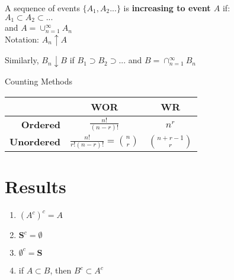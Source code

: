 \documentclass[12pt, oneside, letterpaper]{notes}
\begin{document}
\begin{mydef}
	A sequence of events $\{A_1, A_2 ...\}$ is \textbf{increasing to event $A$} if: \\
	\indent $A_1 \subset A_2 \subset ...$  \\
	\indent and $A = \cup_{n=1}^{\infty} A_n$ \\
	\indent Notation: $A_n \uparrow A$
\end{mydef}

\begin{mydef}
	Similarly, $B_n \downarrow B$ if $B_1 \supset B_2 \supset ... $ and
	$B = \cap_{n=1}^{\infty} B_n$ 
\end{mydef}

%
%
\begin{mydef}
Counting Methods
\begin{table}[h!]
	\begin{tabular}{r|c|c}
		& \textbf{WOR} & \textbf{WR} \\
		\hline
		
		\textbf{Ordered} 
		& $\displaystyle \frac{n!}{(n-r)!} $ 
		& $\displaystyle n^r $ \\
		
		\textbf{Unordered} 
		& $\displaystyle \frac{n!}{r!(n-r)!} 
		= {n \choose r} $ 
		& $\displaystyle {n+r-1 \choose r} $ \\
	\end{tabular}
\end{table}

\end{mydef}

%
%













\section*{Results}
\begin{enumerate}
\item $(A^c)^c = A$
\item $\textbf{S}^c = \emptyset $
\item $ \emptyset^c = \textbf{S} $
\item if $A \subset B$, then $B^c \subset A^c$
\end{enumerate}

%
%
\end{document}
